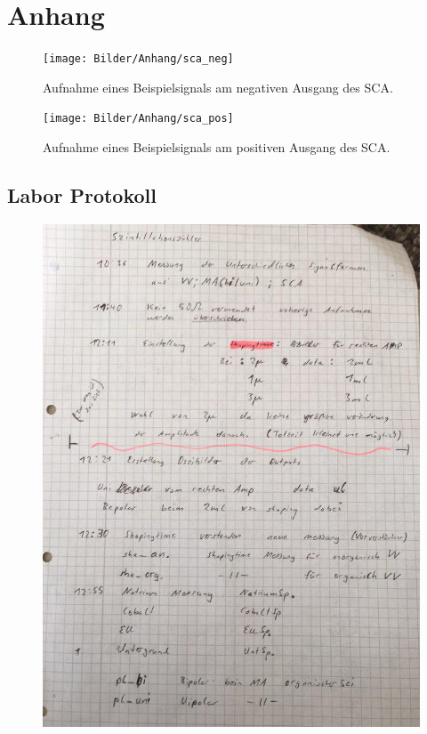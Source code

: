\section{Anhang}
\begin{figure}[h]
	\centering
	\texttt{[image: Bilder/Anhang/sca\_neg]}
	\caption[Negativer Ausgang SCA]{\small Aufnahme eines Beispielsignals am negativen Ausgang des SCA.}
\end{figure}
\begin{figure}[h]
	\centering
	\texttt{[image: Bilder/Anhang/sca\_pos]}
	\caption[Positiver Ausgang SCA]{\small Aufnahme eines Beispielsignals am positiven Ausgang des SCA.}
\end{figure}
\FloatBarrier
\newpage
\subsection{Labor Protokoll}
\begin{figure}[h]
	\centering
	\includegraphics[scale=0.5,angle=-90]{Bilder/Anhang/protokoll_1}
\end{figure}
